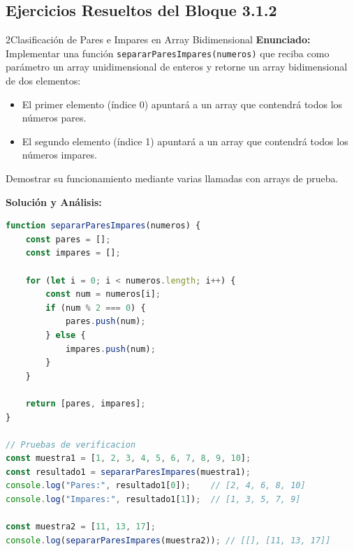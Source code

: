 \subsection{Ejercicios Resueltos del Bloque 3.1.2}

\begin{ejercicioresuelto}{2}{Clasificación de Pares e Impares en Array Bidimensional}
\textbf{Enunciado:} Implementar una función \texttt{separarParesImpares(numeros)} que reciba como parámetro un array unidimensional de enteros y retorne un array bidimensional de dos elementos:
\begin{itemize}
    \item El primer elemento (\'indice 0) apuntará a un array que contendrá todos los números pares.
    \item El segundo elemento (\'indice 1) apuntará a un array que contendrá todos los números impares.
\end{itemize}
Demostrar su funcionamiento mediante varias llamadas con arrays de prueba.

\textbf{Solución y Análisis:}
\begin{lstlisting}[language=javascript, caption={Solución del Ejercicio 2}]
function separarParesImpares(numeros) {
    const pares = [];
    const impares = [];

    for (let i = 0; i < numeros.length; i++) {
        const num = numeros[i];
        if (num % 2 === 0) {
            pares.push(num);
        } else {
            impares.push(num);
        }
    }

    return [pares, impares];
}

// Pruebas de verificacion
const muestra1 = [1, 2, 3, 4, 5, 6, 7, 8, 9, 10];
const resultado1 = separarParesImpares(muestra1);
console.log("Pares:", resultado1[0]);    // [2, 4, 6, 8, 10]
console.log("Impares:", resultado1[1]);  // [1, 3, 5, 7, 9]

const muestra2 = [11, 13, 17];
console.log(separarParesImpares(muestra2)); // [[], [11, 13, 17]]
\end{lstlisting}
\end{ejercicioresuelto}


